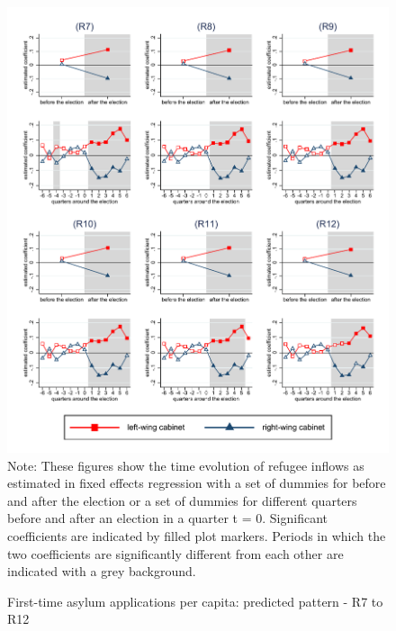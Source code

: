 \documentclass[11pt,a4paper]{scrartcl}
\begin{document}
\clearpage
\FloatBarrier



\clearpage
\FloatBarrier


\clearpage
\FloatBarrier



\clearpage
\FloatBarrier


\clearpage
\FloatBarrier
\begin{figure}[!ht]
	\caption{First-time asylum applications per capita: predicted pattern - R7 to R12}
	\includegraphics[width=1\textwidth]{../results/applications/app_graphs_R7-R12.pdf}
	\scriptsize{Note: These figures show the time evolution of refugee inflows as estimated in fixed effects regression
		with a set of dummies for before and after the election or a set of dummies for different quarters before and after an election in a quarter t = 0. Significant coefficients are indicated by filled plot markers. Periods in which the two coefficients are significantly different from each other are indicated with a grey background.}
\end{figure}
\end{document}
